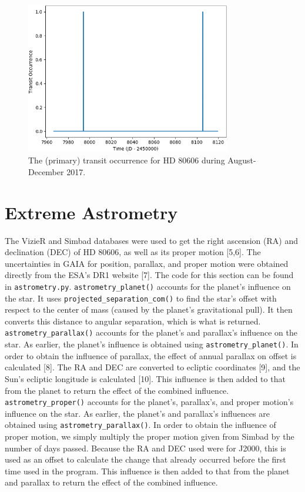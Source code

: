 \documentclass[12pt]{article}
\begin{document}
\begin{figure}[H]
\centering
\vspace{1em}
\includegraphics[width=0.8\textwidth]{transit.png}
\vspace{-1em}
\caption{The (primary) transit occurrence for HD 80606 during August-December 2017.}
\end{figure}


\section{Extreme Astrometry}
The VizieR and Simbad databases were used to get the right ascension (RA) and declination (DEC) of HD 80606, as well as its proper motion [5,6]. The uncertainties in GAIA for position, parallax, and proper motion were obtained directly from the ESA's DR1 website [7]. The code for this section can be found in \texttt{astrometry.py}. \texttt{astrometry\_planet()} accounts for the planet's influence on the star. It uses \texttt{projected\_separation\_com()} to find the star's offset with respect to the center of mass (caused by the planet's gravitational pull). It then converts this distance to angular separation, which is what is returned. \texttt{astrometry\_parallax()} accounts for the planet's and parallax's influence on the star. As earlier, the planet's influence is obtained using \texttt{astrometry\_planet()}. In order to obtain the influence of parallax, the effect of annual parallax on offset is calculated [8]. The RA and DEC are converted to ecliptic coordinates [9], and the Sun's ecliptic longitude is calculated [10]. This influence is then added to that from the planet to return the effect of the combined influence. \texttt{astrometry\_proper()} accounts for the planet's, parallax's, and proper motion's influence on the star. As earlier, the planet's and parallax's influences are obtained using \texttt{astrometry\_parallax()}. In order to obtain the influence of proper motion, we simply multiply the proper motion given from Simbad by the number of days passed. Because the RA and DEC used were for J2000, this is used as an offset to calculate the change that already occurred before the first time used in the program. This influence is then added to that from the planet and parallax to return the effect of the combined influence.
\end{document}
